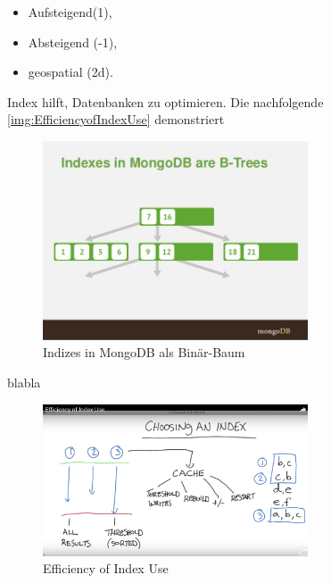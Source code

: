 \begin{itemize}
\item Aufsteigend(1),
\item Absteigend (-1),
\item geospatial (2d).
\end{itemize}

Index hilft, Datenbanken zu optimieren. Die nachfolgende \autoref{img:EfficiencyofIndexUse} demonstriert

\begin{figure}
\centering
	\includegraphics[width=0.7\textwidth]{resources/indexingBtree}
\caption[Indizes in MongoDB als Binär-Baum]{Indizes in MongoDB als Binär-Baum\protect\footnotemark}
\label{img:IndexesInMongoDBAreB-Trees}
\end{figure}

blabla

\begin{figure}
\centering
	\includegraphics[width=0.7\textwidth]{resources/efficiencyOfIndexUse}
\caption[Efficiency of Index Use]{Efficiency of Index Use\protect\footnotemark}
\label{img:EfficiencyofIndexUse}
\end{figure}


